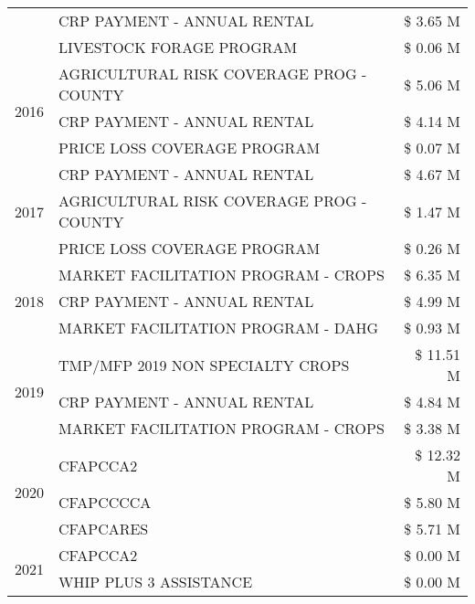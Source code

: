 \begin{tabular}{llr}
 & CRP PAYMENT - ANNUAL RENTAL & \$ 3.65 M \\
 & LIVESTOCK FORAGE PROGRAM & \$ 0.06 M \\
\cline{1-3}
\multirow[t]{3}{*}{2016} & AGRICULTURAL RISK COVERAGE PROG - COUNTY & \$ 5.06 M \\
 & CRP PAYMENT - ANNUAL RENTAL & \$ 4.14 M \\
 & PRICE LOSS COVERAGE PROGRAM & \$ 0.07 M \\
\cline{1-3}
\multirow[t]{3}{*}{2017} & CRP PAYMENT - ANNUAL RENTAL & \$ 4.67 M \\
 & AGRICULTURAL RISK COVERAGE PROG - COUNTY & \$ 1.47 M \\
 & PRICE LOSS COVERAGE PROGRAM & \$ 0.26 M \\
\cline{1-3}
\multirow[t]{3}{*}{2018} & MARKET FACILITATION PROGRAM - CROPS & \$ 6.35 M \\
 & CRP PAYMENT - ANNUAL RENTAL & \$ 4.99 M \\
 & MARKET FACILITATION PROGRAM - DAHG & \$ 0.93 M \\
\cline{1-3}
\multirow[t]{3}{*}{2019} & TMP/MFP 2019 NON SPECIALTY CROPS & \$ 11.51 M \\
 & CRP PAYMENT - ANNUAL RENTAL & \$ 4.84 M \\
 & MARKET FACILITATION PROGRAM - CROPS & \$ 3.38 M \\
\cline{1-3}
\multirow[t]{3}{*}{2020} & CFAPCCA2 & \$ 12.32 M \\
 & CFAPCCCCA & \$ 5.80 M \\
 & CFAPCARES & \$ 5.71 M \\
\cline{1-3}
\multirow[t]{2}{*}{2021} & CFAPCCA2 & \$ 0.00 M \\
 & WHIP PLUS 3 ASSISTANCE & \$ 0.00 M \\
\cline{1-3}
\bottomrule
\end{tabular}

